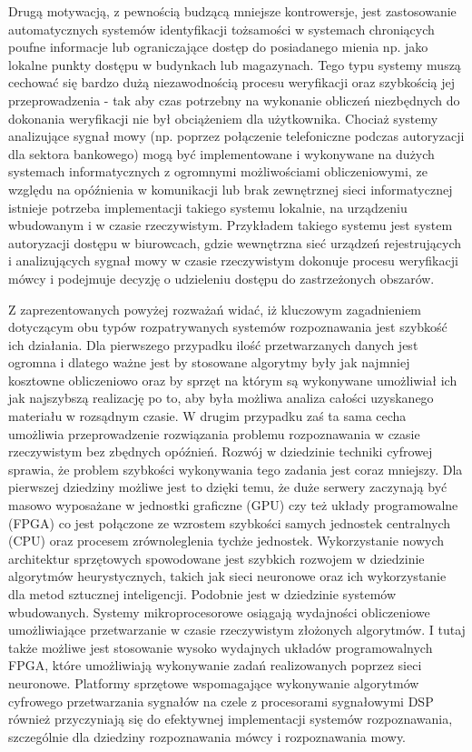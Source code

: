 Drugą motywacją, z pewnością budzącą mniejsze kontrowersje, jest zastosowanie automatycznych systemów identyfikacji tożsamości w systemach chroniących poufne informacje lub ograniczające dostęp do posiadanego mienia np. jako lokalne punkty dostępu w budynkach lub magazynach. Tego typu systemy muszą cechować się bardzo dużą niezawodnością procesu weryfikacji oraz szybkością jej przeprowadzenia - tak aby czas potrzebny na wykonanie obliczeń niezbędnych do dokonania weryfikacji nie był obciążeniem dla użytkownika. Chociaż systemy analizujące sygnał mowy (np. poprzez połączenie telefoniczne podczas autoryzacji dla sektora bankowego) mogą być implementowane i wykonywane na dużych systemach informatycznych z ogromnymi możliwościami obliczeniowymi, ze względu na opóźnienia w komunikacji lub brak zewnętrznej sieci informatycznej istnieje potrzeba implementacji takiego systemu lokalnie, na urządzeniu wbudowanym i w czasie rzeczywistym. Przykładem takiego systemu jest system autoryzacji dostępu w biurowcach, gdzie wewnętrzna sieć urządzeń rejestrujących i analizujących sygnał mowy w czasie rzeczywistym dokonuje procesu weryfikacji mówcy i podejmuje decyzję o udzieleniu dostępu do zastrzeżonych obszarów.

Z zaprezentowanych powyżej rozważań widać, iż kluczowym zagadnieniem dotyczącym obu typów rozpatrywanych systemów rozpoznawania jest szybkość ich działania. Dla pierwszego przypadku ilość przetwarzanych danych jest ogromna i dlatego ważne jest by stosowane algorytmy były jak najmniej kosztowne obliczeniowo oraz by sprzęt na którym są wykonywane umożliwiał ich jak najszybszą realizację po to, aby była możliwa analiza całości uzyskanego materiału w rozsądnym czasie. W drugim przypadku zaś ta sama cecha umożliwia przeprowadzenie rozwiązania problemu rozpoznawania w czasie rzeczywistym bez zbędnych opóźnień. Rozwój w dziedzinie techniki cyfrowej sprawia, że problem szybkości wykonywania tego zadania jest coraz mniejszy. Dla pierwszej dziedziny możliwe jest to dzięki temu, że duże serwery zaczynają być masowo wyposażane w jednostki graficzne (GPU) czy też układy programowalne (FPGA) co jest połączone ze wzrostem szybkości samych jednostek centralnych (CPU) oraz procesem zrównoleglenia tychże jednostek. Wykorzystanie nowych architektur sprzętowych spowodowane jest szybkich rozwojem w dziedzinie algorytmów heurystycznych, takich jak sieci neuronowe oraz ich wykorzystanie dla metod sztucznej inteligencji. Podobnie jest w dziedzinie systemów wbudowanych. Systemy mikroprocesorowe osiągają wydajności obliczeniowe umożliwiające przetwarzanie w czasie rzeczywistym złożonych algorytmów. I tutaj także możliwe jest stosowanie wysoko wydajnych układów programowalnych FPGA, które umożliwiają wykonywanie zadań realizowanych poprzez sieci neuronowe. Platformy sprzętowe wspomagające wykonywanie algorytmów cyfrowego przetwarzania sygnałów na czele z procesorami sygnałowymi DSP również przyczyniają się do efektywnej implementacji systemów rozpoznawania, szczególnie dla dziedziny rozpoznawania mówcy i rozpoznawania mowy.

